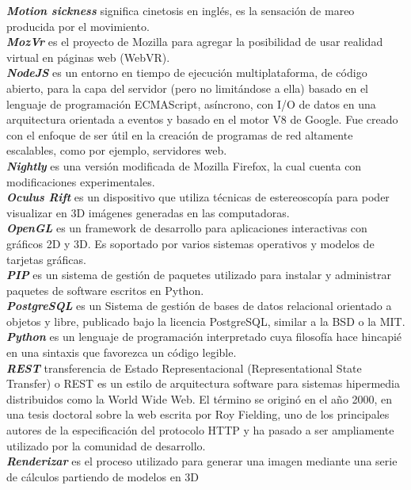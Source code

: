 \documentclass[12pt]{article}
\begin{document}
\textbf{\textit{Motion sickness}} significa cinetosis en inglés, es la sensación de mareo producida por el movimiento.\\
\textbf{\textit{MozVr}} es el proyecto de Mozilla para agregar la posibilidad de usar realidad virtual en páginas web (WebVR).\\
\textbf{\textit{NodeJS}} es un entorno en tiempo de ejecución multiplataforma, de código abierto, para la capa del servidor (pero no limitándose a ella) basado en el lenguaje de programación ECMAScript, asíncrono, con I/O de datos en una arquitectura orientada a eventos y basado en el motor V8 de Google. Fue creado con el enfoque de ser útil en la creación de programas de red altamente escalables, como por ejemplo, servidores web.\\
\textbf{\textit{Nightly}} es una versión modificada de Mozilla Firefox, la cual cuenta con modificaciones experimentales.\\
\textbf{\textit{Oculus Rift}} es un dispositivo que utiliza técnicas de estereoscopía para poder visualizar en 3D imágenes generadas en las computadoras.\\ 
\textbf{\textit{OpenGL}} es un framework de desarrollo para aplicaciones interactivas con gráficos 2D y 3D. Es soportado por varios sistemas operativos y modelos de tarjetas gráficas.\\
\textbf{\textit{PIP}} es un sistema de gestión de paquetes utilizado para instalar y administrar paquetes de software escritos en Python.\\
\textbf{\textit{PostgreSQL}} es un Sistema de gestión de bases de datos relacional orientado a objetos y libre, publicado bajo la licencia PostgreSQL, similar a la BSD o la MIT.\\
\textbf{\textit{Python}} es un lenguaje de programación interpretado cuya filosofía hace hincapié en una sintaxis que favorezca un código legible.\\
\textbf{\textit{REST}} transferencia de Estado Representacional (Representational State Transfer) o REST es un estilo de arquitectura software para sistemas hipermedia distribuidos como la World Wide Web. El término se originó en el año 2000, en una tesis doctoral sobre la web escrita por Roy Fielding, uno de los principales autores de la especificación del protocolo HTTP y ha pasado a ser ampliamente utilizado por la comunidad de desarrollo.\\
\textbf{\textit{Renderizar}} es el proceso utilizado para generar una imagen mediante una serie de cálculos partiendo de modelos en 3D\\
\end{document}
